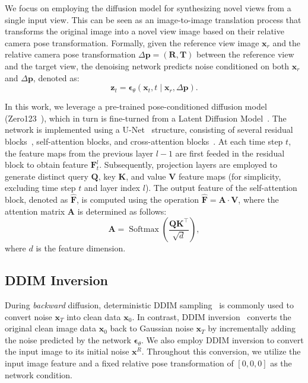 We focus on employing the diffusion model for synthesizing novel views from a single input view. 
This can be seen as an image-to-image translation process that transforms the original image into a novel view image based on their relative camera pose transformation.
Formally, given the reference view image $\boldsymbol{x}_r$ and the relative camera pose transformation $\Delta\boldsymbol{p} = (\mathbf{R}, \mathbf{T})$ between the reference view and the target view, the denoising network predicts noise conditioned on both $\boldsymbol{x}_r$ and $\Delta\boldsymbol{p}$, denoted as:
\begin{equation}
\label{eq:denoise}
    \boldsymbol{z}_t = \boldsymbol{\epsilon}_\theta\left(\boldsymbol{x}_t, t \mid \boldsymbol{x}_r, \Delta\boldsymbol{p}\right).
\end{equation}

In this work, we leverage a pre-trained pose-conditioned diffusion model (Zero123~\cite{zero123}), which in turn is fine-turned from a Latent Diffusion Model~\cite{stable-diffusion}. 
The network is implemented using a U-Net~\cite{unet} structure, consisting of several residual blocks~\cite{resnet}, self-attention blocks, and cross-attention blocks~\cite{transformer}.
At each time step $t$, the feature maps from the previous layer $l-1$ are first feeded in the residual block to obtain feature $\boldsymbol{F}^l_t$.
Subsequently, projection layers are employed to generate distinct query $\boldsymbol{Q}$, key $\boldsymbol{K}$, and value $\boldsymbol{V}$ feature maps (for simplicity, excluding time step $t$ and layer index $l$).
The output feature of the self-attention block, denoted as $\hat{\boldsymbol{F}}$, is computed using the operation $\hat{\boldsymbol{F}} = \boldsymbol{A} \cdot \boldsymbol{V}$, where the attention matrix $\boldsymbol{A}$ is determined as follows:
\begin{equation}
\label{eq:attn_mat}
    \boldsymbol{A}=\operatorname{Softmax}\left(\frac{\boldsymbol{Q} \boldsymbol{K}^\top}{\sqrt{d}}\right),
\end{equation}
where $d$ is the feature dimension.

\subsection{DDIM Inversion} \label{sec:ddim}
\label{subsec:ddim_inversion}
During \textit{backward} diffusion, deterministic DDIM sampling~\cite{ddim} is commonly used to convert noise $\boldsymbol{x}_T$ into clean data $\boldsymbol{x}_0$.
In contrast, DDIM inversion~\cite{ddim, dhariwal2021diffusion} converts the original clean image data $\boldsymbol{x}_0$ back to Gaussian noise $\boldsymbol{x}_T$ by incrementally adding the noise predicted by the network $\boldsymbol{\epsilon}_\theta$.
We also employ DDIM inversion to convert the input image to its initial noise $\boldsymbol{x}^R$. Throughout this conversion, we utilize the input image feature and a fixed relative pose transformation of $[0, 0, 0]$ as the network condition.

